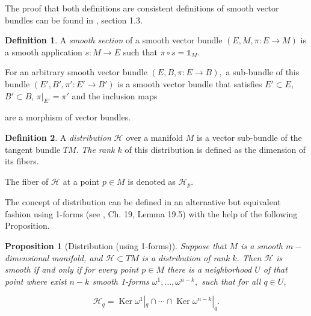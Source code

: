 \documentclass[12pt, letterpaper, reqno]{amsart}
\theoremstyle{definition}
\newtheorem{df}{Definition}
\theoremstyle{plain}
\newtheorem{prop}{Proposition}
\theoremstyle{remark}
\begin{document}
The proof that both definitions are consistent definitions of smooth vector bundles can be found in \cite{luke2013vector}, section 1.3.
\begin{df}
	A \textit{smooth section} of a smooth vector bundle $ (E,M,\pi:E \rightarrow {M}) $ is a smooth application $ s: M \rightarrow {E} $ such that $ \pi\circ s= \mathbb{1}_{M}. $    
\end{df}
For an arbitrary smooth vector bundle $ (E,B,\pi:E \rightarrow {B}), $ a sub-bundle of this bundle $ (E',B',\pi':E' \rightarrow {B'}) $  is a smooth vector bundle that satisfies $ E'\subset E $, $ B'\subset B $, $ \pi|_{E'}=\pi' $ and the inclusion maps 
\begin{center}
\end{center}
are a morphism of vector bundles.
\begin{df}
	
	A \textit{distribution} $ \mathcal{H} $ over a manifold $ M $  is a vector sub-bundle of the tangent bundle $ TM $. \textit{ The rank $ k $}  of this distribution is defined as the dimension of its fibers.

	The fiber of $ \mathcal{H} $ at a point $ p\in M $ is denoted as $ \mathcal{H}_p. $ 
\end{df}

The concept of distribution can be defined in an alternative but equivalent  fashion using 1-forms (see \cite{lee2003introduction}, Ch. 19, Lemma 19.5) with the help of the following Proposition.

\begin{prop}[Distribution (using 1-forms)]
	Suppose that $ M $ is a smooth $ m- $dimensional manifold, and $ \mathcal{H} \subset TM$ is a distribution of rank $k$. Then $ \mathcal{H} $ is smooth if and only if for every point $ p\in M $ there is a neighborhood $ U $ of that point where exist $n-k$ smooth 1-forms $ \omega^1,\dots,\omega^{n-k}, $ such that for all $ q\in U $,

	$$ \mathcal{H}_q = \operatorname{Ker} \omega^1|_q\cap \cdots \cap\operatorname{Ker} \omega^{n-k}|_q.  $$ 
\end{prop}
\end{document}

